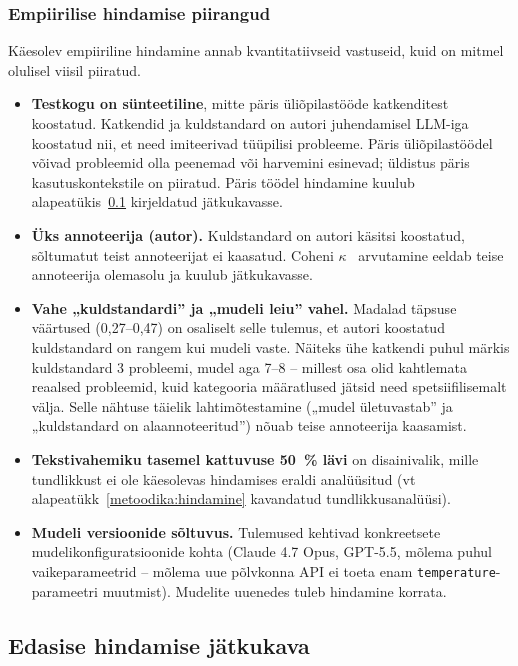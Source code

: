 \subsubsection{Empiirilise hindamise piirangud}

Käesolev empiiriline hindamine annab kvantitatiivseid vastuseid, kuid on mitmel olulisel viisil piiratud.

\begin{itemize}
    \item \textbf{Testkogu on sünteetiline}, mitte päris üliõpilastööde katkenditest koostatud. Katkendid ja kuldstandard on autori juhendamisel LLM-iga koostatud nii, et need imiteerivad tüüpilisi probleeme. Päris üliõpilastöödel võivad probleemid olla peenemad või harvemini esinevad; üldistus päris kasutuskontekstile on piiratud. Päris töödel hindamine kuulub alapeatükis~\ref{hindamine:edasine} kirjeldatud jätkukavasse.
    \item \textbf{Üks annoteerija (autor).} Kuldstandard on autori käsitsi koostatud, sõltumatut teist annoteerijat ei kaasatud. Coheni $\kappa$~\cite{cohen_kappa_1960} arvutamine eeldab teise annoteerija olemasolu ja kuulub jätkukavasse.
    \item \textbf{Vahe „kuldstandardi” ja „mudeli leiu” vahel.} Madalad täpsuse väärtused (0,27--0,47) on osaliselt selle tulemus, et autori koostatud kuldstandard on rangem kui mudeli vaste. Näiteks ühe katkendi puhul märkis kuldstandard 3 probleemi, mudel aga 7--8 -- millest osa olid kahtlemata reaalsed probleemid, kuid kategooria määratlused jätsid need spetsiifilisemalt välja. Selle nähtuse täielik lahtimõtestamine („mudel ületuvastab” ja „kuldstandard on alaannoteeritud”) nõuab teise annoteerija kaasamist.
    \item \textbf{Tekstivahemiku tasemel kattuvuse 50~\% lävi} on disainivalik, mille tundlikkust ei ole käesolevas hindamises eraldi analüüsitud (vt alapeatükk~\ref{metoodika:hindamine} kavandatud tundlikkusanalüüsi).
    \item \textbf{Mudeli versioonide sõltuvus.} Tulemused kehtivad konkreetsete mudelikonfiguratsioonide kohta (Claude 4.7 Opus, GPT-5.5, mõlema puhul vaikeparameetrid -- mõlema uue põlvkonna API ei toeta enam \texttt{temperature}-parameetri muutmist). Mudelite uuenedes tuleb hindamine korrata.
\end{itemize}

\subsection{Edasise hindamise jätkukava} \label{hindamine:edasine}

